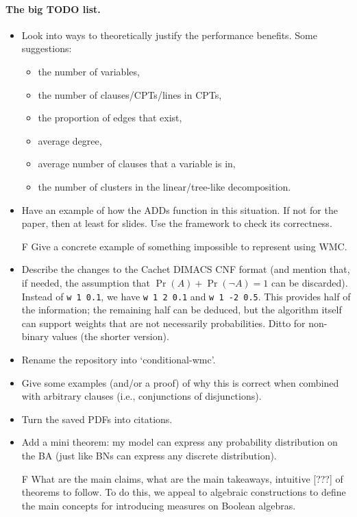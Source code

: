 \documentclass{article}
\theoremstyle{definition}
\theoremstyle{remark}
\begin{document}
\paragraph{The big TODO list.}
\begin{itemize}
\item Look into ways to theoretically justify the performance benefits. Some
  suggestions:
  \begin{itemize}
  \item the number of variables,
  \item the number of clauses/CPTs/lines in CPTs,
  \item the proportion of edges that exist,
  \item average degree,
  \item average number of clauses that a variable is in,
  \item the number of clusters in the linear/tree-like decomposition.
  \end{itemize}
\item Have an example of how the ADDs function in this situation. If not for the
  paper, then at least for slides. Use the framework to check its correctness.
\item[F] Give a concrete example of something impossible to represent using WMC.
\item Describe the changes to the Cachet DIMACS CNF format (and mention that, if
  needed, the assumption that $\Pr(A) + \Pr(\neg A) = 1$ can be discarded).
  Instead of \texttt{w 1 0.1}, we have \texttt{w 1 2 0.1} and \texttt{w 1 -2
    0.5}. This provides half of the information; the remaining half can be
  deduced, but the algorithm itself can support weights that are not necessarily
  probabilities. Ditto for non-binary values (the shorter version).
\item Rename the repository into `conditional-wmc'.
\item Give some examples (and/or a proof) of why this is correct when combined
  with arbitrary clauses (i.e., conjunctions of disjunctions).
\item Turn the saved PDFs into citations.
\item Add a mini theorem: my model can express any probability distribution on
  the BA (just like BNs can express any discrete distribution).
\item[F] What are the main claims, what are the main takeaways, intuitive [???]
  of theorems to follow. To do this, we appeal to algebraic constructions to
  define the main concepts for introducing measures on Boolean algebras.

\end{itemize}
\end{document}
